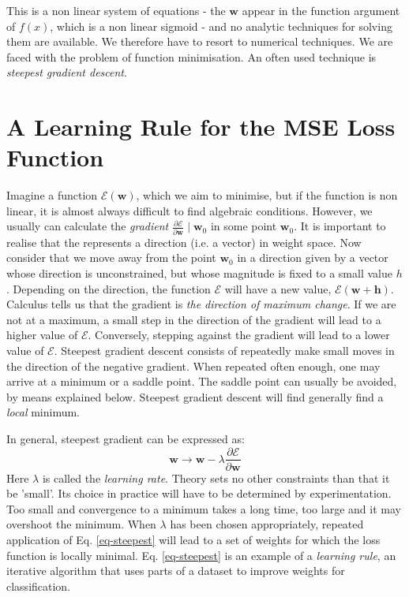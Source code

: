 This is a non linear system of equations - the $\boldsymbol{w}$ appear in the function argument of $f(x)$, which is a non linear sigmoid - and no analytic
techniques for solving them are available. We therefore have to resort to numerical techniques. We are faced with the problem
of function minimisation. An often used technique is \emph{steepest gradient descent}.

\section{A Learning Rule for the MSE Loss Function}

Imagine a function $\mathcal{E}(\boldsymbol{w})$,
which we aim to minimise, but if the function is non linear, it is almost always difficult to find algebraic conditions. However,
we usually can calculate the \emph{gradient} $\frac{\partial \mathcal{E}}{\partial \boldsymbol{w}} \mid{\boldsymbol{w}_0}$ in some point $\boldsymbol{w}_0$.
  It is important to realise that the represents a direction (i.e. a vector) in weight space. Now consider that we move away from the point $\boldsymbol{w}_0$
  in a direction given by a vector whose direction is unconstrained, but whose magnitude is fixed to a small value $h$. Depending on the direction,
  the function $\mathcal{E}$ will have a new value, $\mathcal{E}(\boldsymbol{w} + \boldsymbol{h})$. Calculus tells us that the gradient is \emph{the direction of maximum change}.
  If we are not at a maximum, a small step in the direction of the gradient will lead to a higher value of $\mathcal{E}$. Conversely, stepping against the gradient
  will lead to a lower value of $\mathcal{E}$. Steepest gradient descent consists of repeatedly make small moves in the direction of the negative gradient. When repeated
  often enough, one may arrive at a minimum or a saddle point. The saddle point can usually be avoided, by means explained below. Steepest gradient descent
  will find generally find a \emph{local} minimum. 

  In general, steepest gradient can be expressed as:
  \begin{equation}
    \boldsymbol{w} \rightarrow \boldsymbol{w} - \lambda \frac{\partial \mathcal{E}}{\partial \boldsymbol{w}}
    \label{eq-steepest}
  \end{equation}
  Here $\lambda$ is called the \emph{learning rate}. Theory sets no other constraints than that it be 'small'. Its choice in practice will have to be determined
  by experimentation. Too small and convergence to a minimum takes a long time, too large and it may overshoot the minimum. When $\lambda$ has been chosen
  appropriately, repeated application of Eq. \ref{eq-steepest} will lead to a set of weights for which the loss function is locally minimal.
  Eq. \ref{eq-steepest} is an example of a \emph{learning rule}, an iterative algorithm that uses parts of a dataset to improve weights for classification.
  
